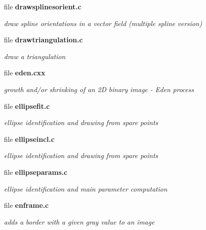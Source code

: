 \begin{CompactItemize}
\item 
file {\bf drawsplinesorient.c}
\begin{CompactList}\small\item\em draw spline orientations in a vector field (multiple spline version) \item\end{CompactList}

\item 
file {\bf drawtriangulation.c}
\begin{CompactList}\small\item\em draw a triangulation \item\end{CompactList}

\item 
file {\bf eden.cxx}
\begin{CompactList}\small\item\em growth and/or shrinking of an 2D binary image - Eden process \item\end{CompactList}

\item 
file {\bf ellipsefit.c}
\begin{CompactList}\small\item\em ellipse identification and drawing from spare points \item\end{CompactList}

\item 
file {\bf ellipseincl.c}
\begin{CompactList}\small\item\em ellipse identification and drawing from spare points \item\end{CompactList}

\item 
file {\bf ellipseparams.c}
\begin{CompactList}\small\item\em ellipse identification and main parameter computation \item\end{CompactList}

\item 
file {\bf enframe.c}
\begin{CompactList}\small\item\em adds a border with a given gray value to an image \item\end{CompactList}


\end{CompactItemize}
